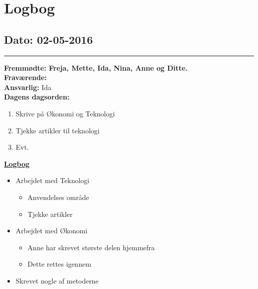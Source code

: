 \chapter{Logbog}
\section{Dato: 02-05-2016}
\hrule
\textbf{Fremmødte: Freja, Mette, Ida, Nina, Anne og Ditte.} \\
\textbf{Fraværende: } \\
\textbf{Ansvarlig: } Ida \\
\textbf{Dagens dagsorden: }
\begin{enumerate}
	\item Skrive på Økonomi og Teknologi
	\item Tjekke artikler til teknologi
	\item Evt. 
\end{enumerate}


\underline{\textbf{Logbog}}
\begin{itemize}
\item Arbejdet med Teknologi
\begin{itemize}
\item Anvendelses område
\item Tjekke artikler
\end{itemize}
\item Arbejdet med Økonomi
\begin{itemize}
\item Anne har skrevet største delen hjemmefra
\item Dette rettes igennem
\end{itemize}
\item Skrevet nogle af metoderne
\end{itemize}
